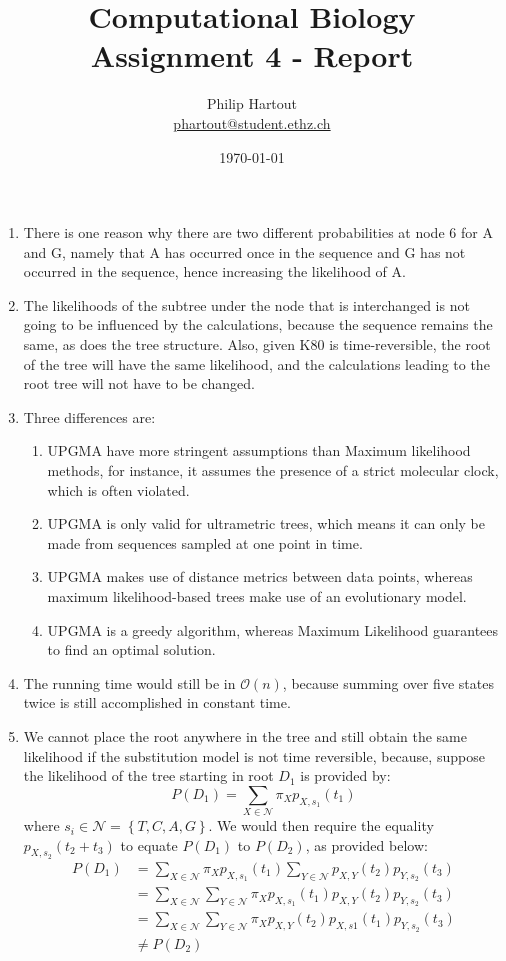 \documentclass[a4paper,10pt,twoside]{article}
\title{Computational Biology \\ Assignment 4 - Report}
\author{Philip Hartout \\ \url{phartout@student.ethz.ch}}
\date{\today}
\begin{document}
\maketitle

\begin{enumerate}
   \item There is one reason why there are two different probabilities at node 6 for A and G, namely that A has occurred once in the sequence and G has not occurred in the sequence, hence increasing the likelihood of A.
   \item The likelihoods of the subtree under the node that is interchanged is not going to be influenced by the calculations, because the sequence remains the same, as does the tree structure. Also, given K80 is time-reversible, the root of the tree will have the same likelihood, and the calculations leading to the root tree will not have to be changed.
   \item Three differences are:
   \begin{enumerate}
       \item UPGMA have more stringent assumptions than Maximum likelihood methods, for instance, it assumes the presence of a strict molecular clock, which is often violated.
       \item UPGMA is only valid for ultrametric trees, which means it can only be made from sequences sampled at one point in time.
       \item UPGMA makes use of distance metrics between data points, whereas maximum likelihood-based trees make use of an evolutionary model.
       \item UPGMA is a greedy algorithm, whereas Maximum Likelihood guarantees to find an optimal solution.
   \end{enumerate}
   \item The running time would still be in $\mathcal{O}(n)$, because summing over five states twice is still accomplished in constant time.
   \item We cannot place the root anywhere in the tree and still obtain the same likelihood if the substitution model is not time reversible, because, suppose the likelihood of the tree starting in root $D_1$ is provided by:
   \begin{equation*}
        P(D_1) = \sum_{X\in \mathcal{N}} \pi_{X}p_{X,s_1}(t_1)
   \end{equation*}
   where $s_i\in \mathcal{N}=\left\{T,C,A,G\right\}$.
   We would then require the equality $p_{X,s_2}(t_2+t_3)$ to equate $P(D_1)$ to $P(D_2)$, as provided below:
   \begin{align*}
       P(D_1) &= \sum_{X\in \mathcal{N}} \pi_{X}p_{X,s_1}(t_1) \sum_{Y\in \mathcal{N}} p_{X,Y}(t_2)p_{Y,s_2}(t_3) \\
       &= \sum_{X\in \mathcal{N}}\sum_{Y\in \mathcal{N}}\pi_{X}p_{X,s_1}(t_1)p_{X,Y}(t_2)p_{Y, s_2}(t_3)\\
       &= \sum_{X\in \mathcal{N}}\sum_{Y\in \mathcal{N}}\pi_{X}p_{X,Y}(t_2)p_{X,s1}(t_1)p_{Y, s_2}(t_3)\\
       & \neq P(D_2)
   \end{align*}

\end{enumerate}
\end{document}
